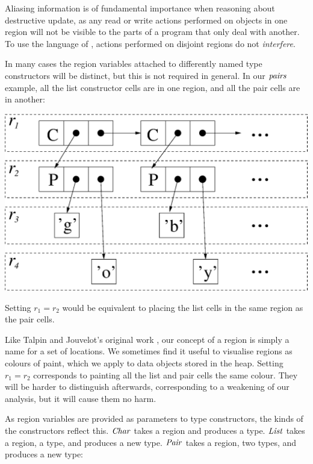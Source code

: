 Aliasing information is of fundamental importance when reasoning about destructive update, as any read or write actions performed on objects in one region will not be visible to the parts of a program that only deal with another. To use the language of \cite{reynolds:interference}, actions performed on disjoint regions do not \emph{interfere}.

In many cases the region variables attached to differently named type constructors will be distinct, but this is not required in general. In our $\operatorname{\mathit{pairs}}$ example, all the list constructor cells are in one region, and all the pair cells are in another:

\smallskip
\begin{center}
\includegraphics[scale=0.4]{2-System/fig/regions-list.eps}
\end{center}
\smallskip

Setting $r_1 = r_2$ would be equivalent to placing the list cells in the same region as the pair cells. 

Like Talpin and Jouvelot's original work \cite{talpin:discipline}, our concept of a region is simply a name for a set of locations. We sometimes find it useful to visualise regions as colours of paint, which we apply to data objects stored in the heap. Setting $r_1 = r_2$ corresponds to painting all the list and pair cells the same colour. They will be harder to distinguish afterwards, corresponding to a weakening of our analysis, but it will cause them no harm.

As region variables are provided as parameters to type constructors, the kinds of the constructors reflect this. $\operatorname{\mathit{Char}}$ takes a region and produces a type. $\operatorname{\mathit{List}}$ takes a region, a type, and produces a new type. $\operatorname{\mathit{Pair}}$ takes a region, two types, and produces a new type:

